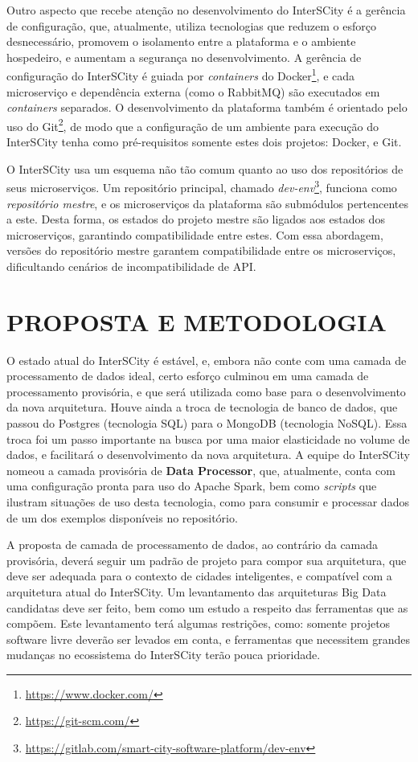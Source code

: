 Outro aspecto que recebe atenção no desenvolvimento do InterSCity é a gerência
de configuração, que, atualmente, utiliza tecnologias que reduzem o esforço
desnecessário, promovem o isolamento entre a plataforma e o ambiente hospedeiro,
e aumentam a segurança no desenvolvimento. A gerência de configuração do
InterSCity é guiada por \textit{containers} do
Docker\footnote{\url{https://www.docker.com/}}, e cada microserviço e
dependência externa (como o RabbitMQ) são executados em
\textit{containers} separados. O desenvolvimento da plataforma também é
orientado pelo uso do Git\footnote{\url{https://git-scm.com/}}, de modo que a
configuração de um ambiente para execução do InterSCity tenha como
pré-requisitos somente estes dois projetos: Docker, e Git.

O InterSCity usa um esquema não tão comum quanto ao uso dos repositórios de
seus microserviços. Um repositório principal, chamado
\textit{dev-env}\footnote{\url{https://gitlab.com/smart-city-software-platform/dev-env}},
funciona como \textit{repositório mestre}, e os microserviços da plataforma são
submódulos pertencentes a este. Desta forma, os estados do projeto mestre são
ligados aos estados dos microserviços, garantindo compatibilidade entre estes.
Com essa abordagem, versões do repositório mestre garantem compatibilidade
entre os microserviços, dificultando cenários de incompatibilidade de API.

\section{PROPOSTA E METODOLOGIA}

O estado atual do InterSCity é estável, e, embora não conte com uma camada de
processamento de dados ideal, certo esforço culminou em uma camada de
processamento provisória, e que será utilizada como base para o desenvolvimento
da nova arquitetura. Houve ainda a troca de tecnologia de banco de dados, que
passou do Postgres (tecnologia SQL) para o MongoDB (tecnologia NoSQL). Essa
troca foi um passo importante na busca por uma maior elasticidade no volume de
dados, e facilitará o desenvolvimento da nova arquitetura. A equipe do
InterSCity nomeou a camada provisória de \textbf{Data Processor}, que,
atualmente, conta com uma configuração pronta para uso do Apache Spark, bem
como \textit{scripts} que ilustram situações de uso desta tecnologia, como
para consumir e processar dados de um dos exemplos disponíveis no
repositório.

A proposta de camada de processamento de dados, ao contrário da camada
provisória, deverá seguir um padrão de projeto para compor sua arquitetura, que
deve ser adequada para o contexto de cidades inteligentes, e compatível com a
arquitetura atual do InterSCity. Um levantamento das arquiteturas Big Data
candidatas deve ser feito, bem como um estudo a respeito das ferramentas que
as compõem. Este levantamento terá algumas restrições, como: somente projetos
software livre deverão ser levados em conta, e ferramentas que necessitem
grandes mudanças no ecossistema do InterSCity terão pouca prioridade.

